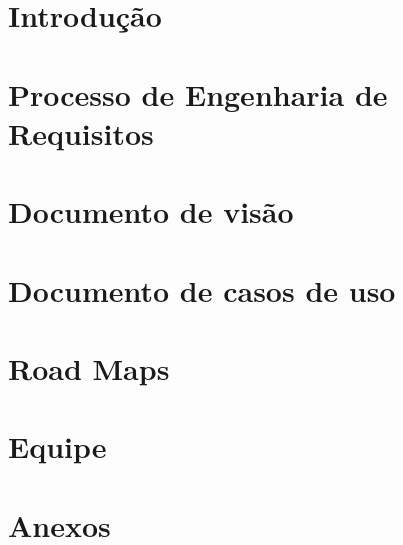 
\section{Introdução} %
\label{sec:introdu_o}
 
\section{Processo de Engenharia de Requisitos}
\label{sec:processo}


% 

\section{Documento de visão}
\label{sec:document_de_visao}


\section{Documento de casos de uso}
\label{sec:documento_de_caso_de_uso}


\section{Road Maps}
\label{sec:road_map}


\section{Equipe} %
\label{sec:equipe}


\section{Anexos}
\label{sec:anexos}


%

%
